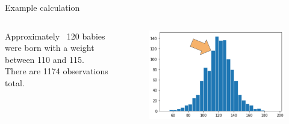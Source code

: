 \documentclass[aspectratio=169]{../latex_main/tntbeamer}  %
\begin{document}
    
    \begin{frame}[c]{Example calculation}
        \begin{columns}
            \begin{column}{.4\textwidth}
            
                   Approximately ~120 babies were born with a weight between 110 and 115.\\
                   \bigskip
                   There are 1174 observations total.

            \end{column}
            
            
            \begin{column}{.4\textwidth}
                   \begin{figure}
                       \includegraphics[scale=.35]{Bild30}
                   \end{figure}

            \end{column}
        \end{columns}
    \end{frame}
    
    
    
\end{document}
